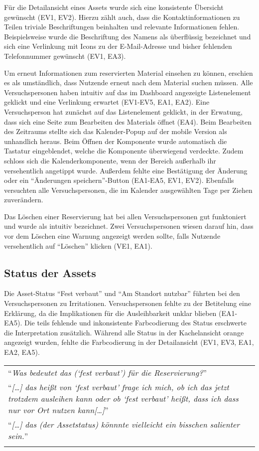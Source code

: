 Für die Detailansicht eines Assets wurde sich eine konsistente Übersicht gewünscht (EV1, EV2).
Hierzu zählt auch, dass die Kontaktinformationen zu Teilen triviale Beschriftungen beinhalten und
relevante Informationen fehlen. Beispielsweise wurde die Beschriftung des Namens als überflüssig
bezeichnet und sich eine Verlinkung mit Icons zu der E-Mail-Adresse und bisher fehlenden
Telefonnummer gewünscht (EV1, EA3).

Um erneut Informationen zum reservierten Material einsehen zu können, erschien es als umständlich,
dass Nutzende erneut nach dem Material suchen müssen. Alle Versuchspersonen haben intuitiv auf das
im Dashboard angezeigte Listenelement geklickt und eine Verlinkung erwartet (EV1-EV5, EA1, EA2).
Eine Versuchsperson hat zunächst auf das Listenelement geklickt, in der Erwatung, dass sich eine
Seite zum Bearbeiten des Materials öffnet (EA4). Beim Bearbeiten des Zeitraums stellte sich das
Kalender-Popup auf der mobile Version als unhandlich heraus. Beim Öffnen der Komponente wurde
automatisch die Tastatur eingeblendet, welche die Komponente überwiegend verdeckte. Zudem schloss
sich die Kalenderkomponente, wenn der Bereich außerhalb ihr versehentlich angetippt wurde. Außerdem
fehlte eine Bestätigung der Änderung oder ein \enquote{Änderungen speichern}-Button (EA1-EA5, EV1,
EV2). Ebenfalls versuchten alle Versuchspersonen, die im Kalender ausgewählten Tage per Ziehen
zuverändern.

Das Löschen einer Reservierung hat bei allen Versuchspersonen gut funktoniert
und wurde als intuitiv bezeichnet. Zwei Versuchspersonen wiesen darauf hin, dass vor dem
Löschen eine Warnung angezeigt werden sollte, falls Nutzende versehentlich auf \enquote{Löschen}
klicken (VE1, EA1).


\subsection{Status der Assets}
Die Asset-Status \enquote{Fest verbaut} und \enquote{Am Standort nutzbar} führten bei den
Versuchspersonen zu Irritationen. Versuchspersonen fehlte zu der Betitelung eine Erklärung, da die
Implikationen für die Ausleihbarkeit unklar blieben (EA1-EA5). Die teils fehlende und inkonsistente
Farbcodierung des Status erschwerte die Interpretation zusätzlich. Während alle Status in der
Kachelansicht orange angezeigt wurden, fehlte die Farbcodierung in der Detailansicht (EV1, EV3, EA1,
EA2, EA5).

\begin{longtable}{p{}} \arrayrulecolor{maincolor}\hline
  \enquote{\textit{Was bedeutet das (\enquote{fest verbaut}) für die Reservierung?}} \\
  \enquote{\textit{[\dots] das heißt von \enquote{fest verbaut} frage ich mich,
      ob ich das jetzt trotzdem ausleihen kann oder ob \enquote{fest verbaut} heißt,
  dass ich dass nur vor Ort nutzen kann[\dots]}}            \\
  \enquote{\textit{[\dots] das (der Assetstatus) könnnte vielleicht ein bisschen
  salienter sein.}}                                         \\
  \arrayrulecolor{maincolor}\hline
\end{longtable}

